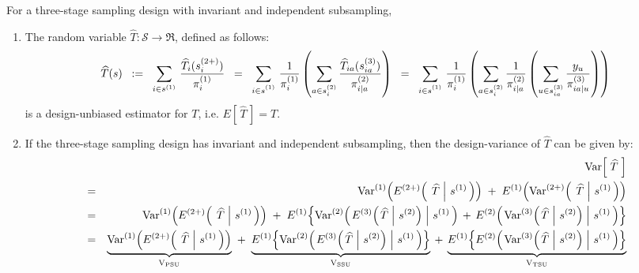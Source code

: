 \begin{theorem}
\mbox{}\vskip 0.1cm
\noindent
For a three-stage sampling design with invariant and independent subsampling,
\begin{enumerate}
\item The random variable $\widehat{T} : \mathcal{S} \longrightarrow \Re$, defined as follows:
\begin{equation*}
\widehat{T}(s)
\;\;:=\;\; \sum_{i\in s^{(1)}}\,\frac{\widehat{T}_{i}(s^{(2+)}_{i})}{\pi^{(1)}_{i}}
\;\; =\;\; \sum_{i\in s^{(1)}_{\color{white}i}}\,\frac{1}{\pi^{(1)}_{i}}\left(\sum_{a \in s^{(2)}_{i}} \dfrac{\widehat{T}_{ia}(s^{(3)}_{ia})}{\pi^{(2)}_{i\vert a}}\right)
\;\; =\;\; \sum_{i\in s^{(1)}_{\color{white}i}}\,\frac{1}{\pi^{(1)}_{i}}\left(\sum_{a \in s^{(2)}_{i}} \dfrac{1}{\pi^{(2)}_{i\vert a}}\left(\sum_{u\in s^{(3)}_{ia}}\dfrac{y_{u}}{\pi^{(3)}_{ia\vert u}}\right)\right)
\end{equation*}
is a design-unbiased estimator for $T$, i.e. $E\!\left[\,\widehat{T}\,\right] = T$.
\item
If the three-stage sampling design has invariant and independent subsampling,
then the design-variance of $\widehat{T}$ can be given by:
\begin{eqnarray*}
&& \Var\!\left[\;\widehat{T}\;\right] \\
&=&
\Var^{(1)}\!\left(E^{(2+)}\!\left(\;\left.\widehat{T}\;\right\vert\,s^{(1)}\,\right)\right)
\;+\;
E^{(1)}\!\left(\Var^{(2+)}\!\left(\;\left.\widehat{T}\;\right\vert\,s^{(1)}\,\right)\right)
\\
&=&
\Var^{(1)}\!\left(E^{(2+)}\!\left(\;\left.\widehat{T}\;\right\vert\,s^{(1)}\,\right)\right)
\;+\;
E^{(1)}\!\left\{
\Var^{(2)}\!\left(\left.E^{(3)}\!\left(\left.\widehat{T}\;\right\vert\,s^{(2)}\right)\;\right\vert\,s^{(1)}\,\right)
\,+\,
E^{(2)}\!\left(\left.\Var^{(3)}\!\left(\left.\widehat{T}\;\right\vert\,s^{(2)}\right)\;\right\vert\,s^{(1)}\,\right)
\right\}
\\
&=&
\underset{\textnormal{V}_{\textnormal{PSU}}}{\underbrace{
\Var^{(1)}\!\left(E^{(2+)}\!\left(\;\left.\widehat{T}\;\right\vert\,s^{(1)}\,\right)\right)
}}
\;+\;
\underset{\textnormal{V}_{\textnormal{SSU}}}{\underbrace{
E^{(1)}\!\left\{
\Var^{(2)}\!\left(\left.E^{(3)}\!\left(\left.\widehat{T}\;\right\vert\,s^{(2)}\right)\;\right\vert\,s^{(1)}\,\right)
\right\}
}}
\,+\,
\underset{\textnormal{V}_{\textnormal{TSU}}}{\underbrace{
E^{(1)}\!\left\{
E^{(2)}\!\left(\left.\Var^{(3)}\!\left(\left.\widehat{T}\;\right\vert\,s^{(2)}\right)\;\right\vert\,s^{(1)}\,\right)
\right\}
}}
\end{eqnarray*}
\end{enumerate}
\end{theorem}
